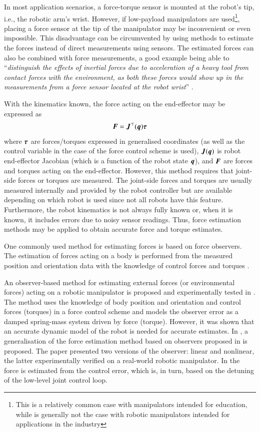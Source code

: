 In most application scenarios, a force-torque sensor is mounted at the robot's tip, i.e., the robotic arm's wrist. However, if low-payload manipulators are used\footnote{This is a relatively common case with manipulators intended for education, while is generally not the case with robotic manipulators intended for applications in the industry}, placing a force sensor at the tip of the manipulator may be inconvenient or even impossible. This disadvantage can be circumvented by using methods to estimate the forces instead of direct measurements using sensors. The estimated forces can also be combined with force measurements, a good example being able to ``\emph{distinguish the effects of inertial forces due to acceleration of a heavy tool from contact forces with the environment, as both these forces would show up in the measurements from a force sensor located at the robot wrist}'' \cite{Alcocer2003}.

With the kinematics known, the force acting on the end-effector may be expressed as 
\[
    {\bm{F}} = {\bm{J}}^\top({\bm{q}}){\bm{\tau}}
\]
where ${\bm{\tau}}$ are forces/torques expressed in generalised coordinates (as well as the control variable in the case of the force control scheme is used), ${\bm{J}}({\bm{q}})$ is robot end-effector Jacobian (which is a function of the robot state ${\bm{q}}$), and ${\bm{F}}$ are forces and torques acting on the end-effector. However, this method requires that joint-side forces or torques are measured. The joint-side forces and torques are usually measured internally and provided by the robot controller but are available depending on which robot is used since not all robots have this feature. Furthermore, the robot kinematics is not always fully known or, when it is known, it includes errors due to noisy sensor readings. Thus, force estimation methods may be applied to obtain accurate force and torque estimates. 

One commonly used method for estimating forces is based on force observers. The estimation of forces acting on a body is performed from the measured position and orientation data with the knowledge of control forces and torques \cite{Hacksel1994,Ohishi1991,Eom1998,Alcocer2003,Stolt2012}.

An observer-based method for estimating external forces (or environmental forces) acting on a robotic manipulator is proposed and experimentally tested in \cite{Hacksel1994}. The method uses the knowledge of body position and orientation and control forces (torques) in a force control scheme and models the observer error as a damped spring-mass system driven by force (torque). However, it was shown that an accurate dynamic model of the robot is needed for accurate estimates. In \cite{Alcocer2003}, a generalisation of the force estimation method based on observers proposed in \cite{Hacksel1994} is proposed. The paper presented two versions of the observer: linear and nonlinear, the latter experimentally verified on a real-world robotic manipulator. In \cite{Stolt2012} the force is estimated from the control error, which is, in turn, based on the detuning of the low-level joint control loop.

